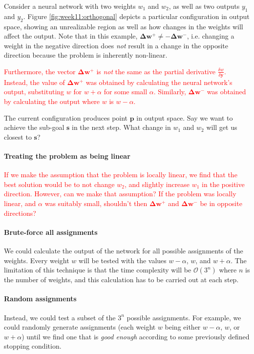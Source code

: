 \documentclass{article}
\renewcommand\vec{\mathbf}
\begin{document}
Consider a neural network with two weights $w_1$ and $w_2$, as well as two outputs $y_1$ and $y_2$. 
Figure \ref{fig:week11:orthogonal} depicts a particular configuration in output space, showing an unrealizable region as well as how changes in the weights will affect the output. 
Note that in this example, $\vec{\Delta w^+} \neq -\vec{\Delta w^-}$, i.e. changing a weight in the negative direction does \textit{not} result in a change in the opposite direction because the problem is inherently non-linear. 

\textcolor{red}{
Furthermore, the vector $\vec{\Delta w^+}$ is \textit{not} the same as the partial derivative $\frac{\delta w}{\delta \vec{y}}$. 
Instead, the value of $\vec{\Delta w^+}$ was obtained by calculating the neural network's output, substituting $w$ for $w+\alpha$ for some small $\alpha$. 
Similarly, $\vec{\Delta w^-}$ was obtained by calculating the output where $w$ is $w-\alpha$. 
}

The current configuration produces point $\vec{p}$ in output space. 
Say we want to achieve the sub-goal $\vec{s}$ in the next step.
What change in $w_1$ and $w_2$ will get us closest to $\vec{s}$?

\paragraph{Treating the problem as being linear}
\textcolor{red}{
If we make the assumption that the problem is locally linear, we find that the best solution would be to not change $w_2$, and slightly increase $w_1$ in the positive direction.
However, can we make that assumption? 
If the problem was locally linear, and $\alpha$ was suitably small, shouldn't then $\vec{\Delta w^+}$ and $\vec{\Delta w^-}$ be in opposite directions?
}

\paragraph{Brute-force all assignments}
We could calculate the output of the network for all possible assignments of the weights. 
Every weight $w$ will be tested with the values $w-\alpha$, $w$, and $w+\alpha$. 
The limitation of this technique is that the time complexity will be $\mathcal{O}(3^n)$ where $n$ is the number of weights, and this calculation has to be carried out at each step. 

\paragraph{Random assignments}
Instead, we could test a subset of the $3^n$ possible assignments. For example, we could randomly generate assignments (each weight $w$ being either $w-\alpha$, $w$, or $w+\alpha$) until we find one that is \textit{good enough} according to some previously defined stopping condition. 
\end{document}
